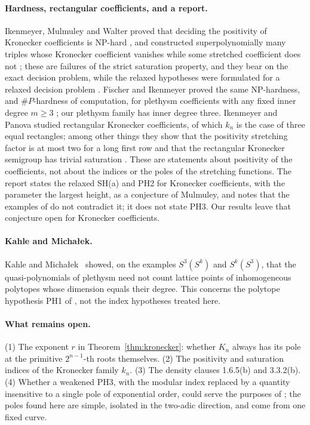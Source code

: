 \paragraph{Hardness, rectangular coefficients, and a report.}
Ikenmeyer, Mulmuley and Walter proved that deciding the positivity of Kronecker
coefficients is NP-hard \cite[Theorem 1.3, p.~7]{IMW}, and constructed
superpolynomially many triples whose Kronecker coefficient vanishes while some
stretched coefficient does not \cite[Theorem 1.7, p.~11]{IMW}; these are
failures of the strict saturation property, and they bear on the exact decision
problem, while the relaxed hypotheses were formulated for a relaxed decision
problem \cite[Theorem 3.3.6, p.~52]{GCT6}. Fischer and Ikenmeyer proved the
same NP-hardness, and $\#P$-hardness of computation, for plethysm coefficients
with any fixed inner degree $m\ge3$ \cite[Theorems 3.1 and 3.2, p.~5]{FI}; our
plethysm family has inner degree three. Ikenmeyer and Panova studied
rectangular Kronecker coefficients, of which $k_n$ is the case of three equal
rectangles; among other things they show that the positivity stretching
factor is at most two for a long first row and that the rectangular Kronecker
semigroup has trivial saturation \cite[Section 5(c),(d), p.~13]{IP}. These are
statements about positivity of the coefficients, not about the indices or the
poles of the stretching functions. The report \cite[Conjecture 3, p.~3]{ICERM}
states the relaxed SH(a) and PH2 for Kronecker coefficients, with the parameter
the largest height, as a conjecture of Mulmuley, and notes that the examples of
\cite{BOR} do not contradict it; it does not state PH3. Our results leave that
conjecture open for Kronecker coefficients.

\paragraph{Kahle and Micha\l{}ek.}
Kahle and Micha\l{}ek~\cite{KM} showed, on the examples $S^3(S^k)$ and
$S^k(S^3)$, that the quasi-polynomials of plethysm need not count lattice points
of inhomogeneous polytopes whose dimension equals their degree. This concerns
the polytope hypothesis PH1 of \cite{GCT6}, not the index hypotheses treated
here.

\paragraph{What remains open.}
(1) The exponent $r$ in Theorem~\ref{thm:kronecker}: whether $K_n$ always has
its pole at the primitive $2^{n-1}$-th roots themselves. (2) The positivity and
saturation indices of the Kronecker family $k_n$. (3) The density clauses
1.6.5(b) and 3.3.2(b). (4) Whether a weakened PH3, with the modular index
replaced by a quantity insensitive to a single pole of exponential order, could
serve the purposes of \cite{GCT6}; the poles found here are simple, isolated in
the two-adic direction, and come from one fixed curve.

